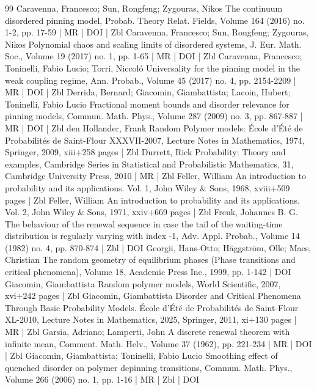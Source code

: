 \documentclass[10pt]{amsart}
\theoremstyle{definition}\newtheorem{defi}[theo]{Definition}\newtheorem{rema}[theo]{Remark}\newtheorem{exam}[theo]{Example}\newtheorem{exem}[theo]{Example}\newtheorem{nota}[theo]{Notation}
\begin{document}
\begin{thebibliography}{99}
Caravenna, Francesco; Sun, Rongfeng; Zygouras, Nikos The continuum disordered pinning model, Probab. Theory Relat. Fields, Volume 164 (2016) no. 1-2, pp. 17-59 | MR | DOI | Zbl
Caravenna, Francesco; Sun, Rongfeng; Zygouras, Nikos Polynomial chaos and scaling limits of disordered systems, J. Eur. Math. Soc., Volume 19 (2017) no. 1, pp. 1-65 | MR | DOI | Zbl
Caravenna, Francesco; Toninelli, Fabio Lucio; Torri, Niccoló Universality for the pinning model in the weak coupling regime, Ann. Probab., Volume 45 (2017) no. 4, pp. 2154-2209 | MR | DOI | Zbl
Derrida, Bernard; Giacomin, Giambattista; Lacoin, Hubert; Toninelli, Fabio Lucio Fractional moment bounds and disorder relevance for pinning models, Commun. Math. Phys., Volume 287 (2009) no. 3, pp. 867-887 | MR | DOI | Zbl
den Hollander, Frank Random Polymer models: École d’Été de Probabilités de Saint-Flour XXXVII-2007, Lecture Notes in Mathematics, 1974, Springer, 2009, xiii+258 pages | Zbl
Durrett, Rick Probability: Theory and examples, Cambridge Series in Statistical and Probabilistic Mathematics, 31, Cambridge University Press, 2010 | MR | Zbl
Feller, William An introduction to probability and its applications. Vol. 1, John Wiley \& Sons, 1968, xviii+509 pages | Zbl
Feller, William An introduction to probability and its applications. Vol. 2, John Wiley \& Sons, 1971, xxiv+669 pages | Zbl
Frenk, Johannes B. G. The behaviour of the renewal sequence in case the tail of the waiting-time distribution is regularly varying with index -1, Adv. Appl. Probab., Volume 14 (1982) no. 4, pp. 870-874 | Zbl | DOI
Georgii, Hans-Otto; Häggström, Olle; Maes, Christian The random geometry of equilibrium phases (Phase transitions and critical phenomena), Volume 18, Academic Press Inc., 1999, pp. 1-142 | DOI
Giacomin, Giambattista Random polymer models, World Scientific, 2007, xvi+242 pages | Zbl
Giacomin, Giambattista Disorder and Critical Phenomena Through Basic Probability Models. École d’Été de Probabilités de Saint-Flour XL-2010, Lecture Notes in Mathematics, 2025, Springer, 2011, xi+130 pages | MR | Zbl
Garsia, Adriano; Lamperti, John A discrete renewal theorem with infinite mean, Comment. Math. Helv., Volume 37 (1962), pp. 221-234 | MR | DOI | Zbl
Giacomin, Giambattista; Toninelli, Fabio Lucio Smoothing effect of quenched disorder on polymer depinning transitions, Commun. Math. Phys., Volume 266 (2006) no. 1, pp. 1-16 | MR | Zbl | DOI

\end{thebibliography}
\end{document}
